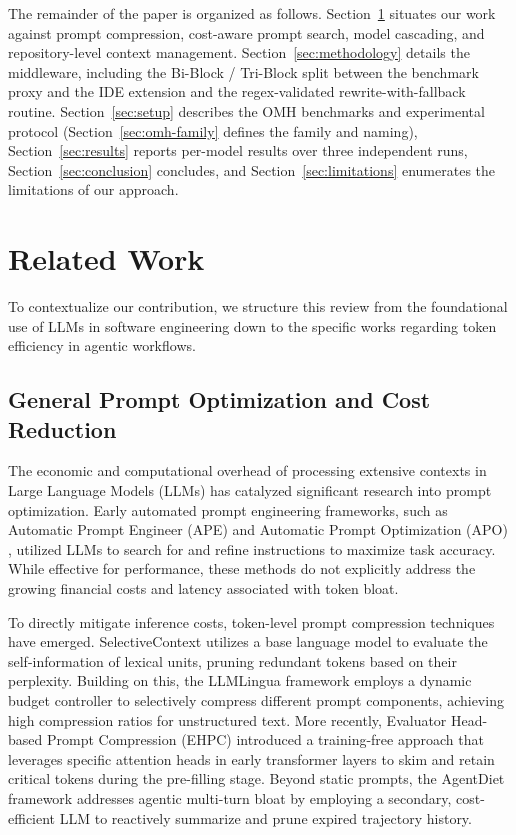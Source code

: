 \documentclass[11pt,a4paper,twocolumn]{article}
\begin{document}
The remainder of the paper is organized as follows. Section~\ref{sec:related} situates our work against prompt compression, cost-aware prompt search, model cascading, and repository-level context management. Section~\ref{sec:methodology} details the middleware, including the Bi-Block / Tri-Block split between the benchmark proxy and the IDE extension and the regex-validated rewrite-with-fallback routine. Section~\ref{sec:setup} describes the OMH benchmarks and experimental protocol (Section~\ref{sec:omh-family} defines the family and naming), Section~\ref{sec:results} reports per-model results over three independent runs, Section~\ref{sec:conclusion} concludes, and Section~\ref{sec:limitations} enumerates the limitations of our approach.

\section{Related Work}
\label{sec:related}
To contextualize our contribution, we structure this review from the foundational use of LLMs in software engineering down to the specific works regarding token efficiency in agentic workflows.

\subsection{General Prompt Optimization and Cost Reduction}

The economic and computational overhead of processing extensive contexts in Large Language Models (LLMs) has catalyzed significant research into prompt optimization. Early automated prompt engineering frameworks, such as Automatic Prompt Engineer (APE) \cite{zhou2023large} and Automatic Prompt Optimization (APO) \cite{pryzant-etal-2023-automatic}, utilized LLMs to search for and refine instructions to maximize task accuracy. While effective for performance, these methods do not explicitly address the growing financial costs and latency associated with token bloat.

To directly mitigate inference costs, token-level prompt compression techniques have emerged. SelectiveContext \cite{li-etal-2023-compressing} utilizes a base language model to evaluate the self-information of lexical units, pruning redundant tokens based on their perplexity. Building on this, the LLMLingua framework \cite{jiang-etal-2023-llmlingua} employs a dynamic budget controller to selectively compress different prompt components, achieving high compression ratios for unstructured text. More recently, Evaluator Head-based Prompt Compression (EHPC) \cite{fei2025efficient} introduced a training-free approach that leverages specific attention heads in early transformer layers to skim and retain critical tokens during the pre-filling stage. Beyond static prompts, the AgentDiet framework \cite{xiao2026reducing} addresses agentic multi-turn bloat by employing a secondary, cost-efficient LLM to reactively summarize and prune expired trajectory history.
\end{document}
